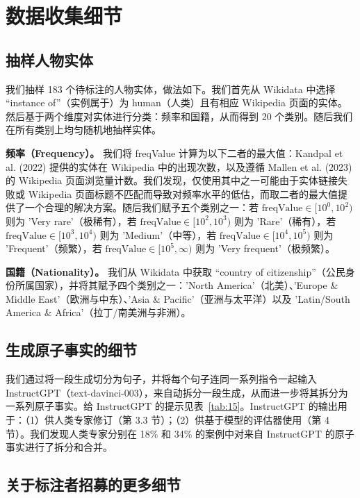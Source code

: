 \documentclass[11pt,UTF8,fontset=fandol]{ctexart}
\begin{document}
\endgroup

\appendix
\section{数据收集细节}

\subsection{抽样人物实体}

我们抽样 183 个待标注的人物实体，做法如下。我们首先从 Wikidata 中选择 “instance of”（实例属于）为 human（人类）且有相应 Wikipedia 页面的实体。然后基于两个维度对实体进行分类：频率和国籍，从而得到 20 个类别。随后我们在所有类别上均匀随机地抽样实体。

\textbf{频率（Frequency）。} 我们将 freqValue 计算为以下二者的最大值：Kandpal et al. (2022) 提供的实体在 Wikipedia 中的出现次数，以及遵循 Mallen et al. (2023) 的 Wikipedia 页面浏览量计数。我们发现，仅使用其中之一可能由于实体链接失败或 Wikipedia 页面标题不匹配而导致对频率水平的低估，而取二者的最大值提供了一个合理的解决方案。随后我们赋予五个类别之一：若 $\text{freqValue} \in [10^0, 10^2)$ 则为 'Very rare'（极稀有），若 $\text{freqValue} \in [10^2, 10^3)$ 则为 'Rare'（稀有），若 $\text{freqValue} \in [10^3, 10^4)$ 则为 'Medium'（中等），若 $\text{freqValue} \in [10^4, 10^5)$ 则为 'Frequent'（频繁），若 $\text{freqValue} \in [10^5, \infty)$ 则为 'Very frequent'（极频繁）。

\textbf{国籍（Nationality）。} 我们从 Wikidata 中获取 “country of citizenship”（公民身份所属国家），并将其赋予四个类别之一：'North America'（北美）、'Europe \& Middle East'（欧洲与中东）、'Asia \& Pacific'（亚洲与太平洋）以及 'Latin/South America \& Africa'（拉丁/南美洲与非洲）。

\subsection{生成原子事实的细节}

我们通过将一段生成切分为句子，并将每个句子连同一系列指令一起输入 InstructGPT（text-davinci-003），来自动拆分一段生成，从而进一步将其拆分为一系列原子事实。给 InstructGPT 的提示见表~\ref{tab:15}。InstructGPT 的输出用于：（1）供人类专家修订（第 3.3 节）；（2）供基于模型的评估器使用（第 4 节）。我们发现人类专家分别在 18\% 和 34\% 的案例中对来自 InstructGPT 的原子事实进行了拆分和合并。

\subsection{关于标注者招募的更多细节}
\end{document}
